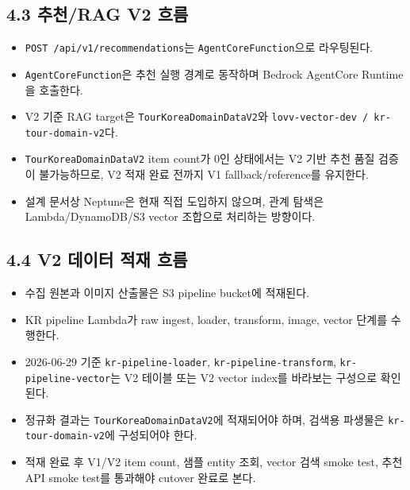 \documentclass[12pt,a4paper]{article}
\newcommand{\DocNeedspace}[1]{\par\ifdim\dimexpr\pagegoal-\pagetotal\relax<#1\newpage\fi}
\begin{document}
\newpage
\DocNeedspace{24\baselineskip}
\subsection*{4.3 추천/RAG V2 흐름}


\begin{itemize}
\item \texttt{POST /\allowbreak{}api/\allowbreak{}v1/\allowbreak{}recommendations}는 \texttt{Agent\allowbreak{}Core\allowbreak{}Function}으로 라우팅된다.
\item \texttt{Agent\allowbreak{}Core\allowbreak{}Function}은 추천 실행 경계로 동작하며 Bedrock AgentCore Runtime을 호출한다.
\item V2 기준 RAG target은 \texttt{Tour\allowbreak{}Korea\allowbreak{}Domain\allowbreak{}Data\allowbreak{}V2}와 \texttt{lovv-\allowbreak{}vector-\allowbreak{}dev /\allowbreak{} kr-\allowbreak{}tour-\allowbreak{}domain-\allowbreak{}v2}다.
\item \texttt{Tour\allowbreak{}Korea\allowbreak{}Domain\allowbreak{}Data\allowbreak{}V2} item count가 0인 상태에서는 V2 기반 추천 품질 검증이 불가능하므로, V2 적재 완료 전까지 V1 fallback/reference를 유지한다.
\item 설계 문서상 Neptune은 현재 직접 도입하지 않으며, 관계 탐색은 Lambda/DynamoDB/S3 vector 조합으로 처리하는 방향이다.
\end{itemize}


\newpage
\DocNeedspace{24\baselineskip}
\subsection*{4.4 V2 데이터 적재 흐름}


\begin{itemize}
\item 수집 원본과 이미지 산출물은 S3 pipeline bucket에 적재된다.
\item KR pipeline Lambda가 raw ingest, loader, transform, image, vector 단계를 수행한다.
\item 2026-06-29 기준 \texttt{kr-\allowbreak{}pipeline-\allowbreak{}loader}, \texttt{kr-\allowbreak{}pipeline-\allowbreak{}transform}, \texttt{kr-\allowbreak{}pipeline-\allowbreak{}vector}는 V2 테이블 또는 V2 vector index를 바라보는 구성으로 확인된다.
\item 정규화 결과는 \texttt{Tour\allowbreak{}Korea\allowbreak{}Domain\allowbreak{}Data\allowbreak{}V2}에 적재되어야 하며, 검색용 파생물은 \texttt{kr-\allowbreak{}tour-\allowbreak{}domain-\allowbreak{}v2}에 구성되어야 한다.
\item 적재 완료 후 V1/V2 item count, 샘플 entity 조회, vector 검색 smoke test, 추천 API smoke test를 통과해야 cutover 완료로 본다.
\end{itemize}
\end{document}
